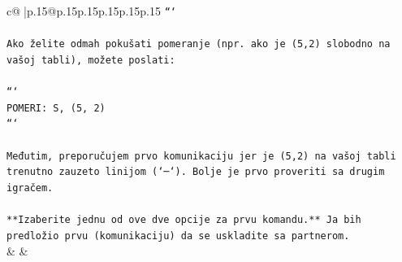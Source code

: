 \documentclass{article}
\begin{document}
{\begin{supertabular}{c@{$\;$}|p{.15\linewidth}@{}p{.15\linewidth}p{.15\linewidth}p{.15\linewidth}p{.15\linewidth}p{.15\linewidth}}
{{{\texttt{```} \\
\\ 
\texttt{Ako želite odmah pokušati pomeranje (npr. ako je (5,2) slobodno na vašoj tabli), možete poslati:} \\
\\ 
\texttt{```} \\
\texttt{POMERI: S, (5, 2)} \\
\texttt{```} \\
\\ 
\texttt{Međutim, preporučujem prvo komunikaciju jer je (5,2) na vašoj tabli trenutno zauzeto linijom (`─`). Bolje je prvo proveriti sa drugim igračem.} \\
\\ 
\texttt{**Izaberite jednu od ove dve opcije za prvu komandu.** Ja bih predložio prvu (komunikaciju) da se uskladite sa partnerom.} \\
            }
        }
    }
    & & \\ \\


\end{supertabular}}
\end{document}

